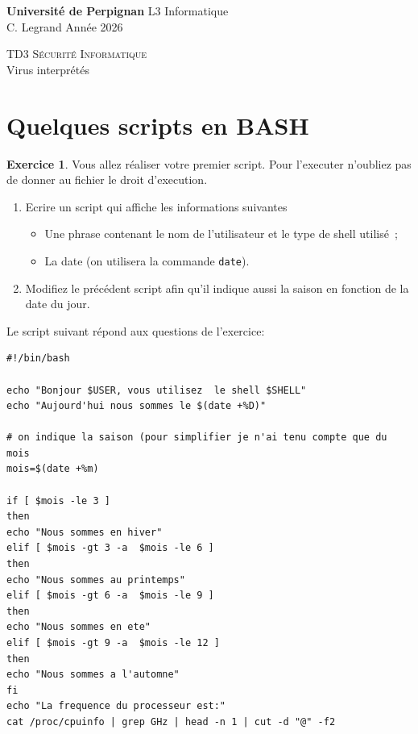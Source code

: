 \documentclass[a4paper,11pt]{article}
\newcommand{\itemb}{\item[$\bullet$]}
\theoremstyle{plain}
\theoremstyle{definition}
\newtheorem{exercice}{Exercice}
\begin{document}
\hbox{}
\noindent \textbf{Université de Perpignan} \hfill  L3 Informatique \\
 \hfill C. Legrand \hfill  Année 2026  \\
\smallskip
\begin{center}
{
 {\scshape \large TD3 Sécurité Informatique}  \\
 Virus interprétés
}
\end{center}
\hbox{}

\bigskip

\bigskip

\section{Quelques scripts en BASH}
  
\begin{exercice}

 Vous allez réaliser votre premier script. Pour l'executer n'oubliez pas de donner au fichier le droit d'execution.  
\begin{enumerate}
\item Ecrire un script qui affiche les informations suivantes
\begin{itemize}
\itemb Une phrase contenant le nom de l'utilisateur et le type de shell utilisé~;
\itemb La date (on utilisera la commande \verb|date|).
\end{itemize}
\item Modifiez le précédent script afin qu'il indique aussi la saison en fonction de la date du jour.
\end{enumerate}
\end{exercice}


\begin{correction}
Le script suivant répond aux questions de l'exercice:
\begin{verbatim}
#!/bin/bash

echo "Bonjour $USER, vous utilisez  le shell $SHELL"
echo "Aujourd'hui nous sommes le $(date +%D)"

# on indique la saison (pour simplifier je n'ai tenu compte que du mois
mois=$(date +%m)

if [ $mois -le 3 ]
then 
echo "Nous sommes en hiver"
elif [ $mois -gt 3 -a  $mois -le 6 ]
then
echo "Nous sommes au printemps"
elif [ $mois -gt 6 -a  $mois -le 9 ]
then
echo "Nous sommes en ete"
elif [ $mois -gt 9 -a  $mois -le 12 ]
then
echo "Nous sommes a l'automne"
fi
echo "La frequence du processeur est:"
cat /proc/cpuinfo | grep GHz | head -n 1 | cut -d "@" -f2

\end{verbatim}
\end{correction}
\end{document}
